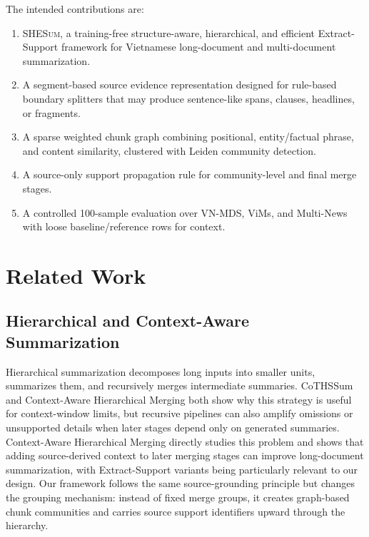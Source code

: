 \documentclass[11pt]{article}
\newcommand{\methodname}{\textsc{SHESum}}
\begin{document}
The intended contributions are:

\begin{enumerate}
    \item \methodname{}, a training-free structure-aware, hierarchical, and efficient Extract-Support framework for Vietnamese long-document and multi-document summarization.
    \item A segment-based source evidence representation designed for rule-based boundary splitters that may produce sentence-like spans, clauses, headlines, or fragments.
    \item A sparse weighted chunk graph combining positional, entity/factual phrase, and content similarity, clustered with Leiden community detection.
    \item A source-only support propagation rule for community-level and final merge stages.
    \item A controlled 100-sample evaluation over VN-MDS, ViMs, and Multi-News with loose baseline/reference rows for context.
\end{enumerate}

\section{Related Work}
\label{sec:related}

\subsection{Hierarchical and Context-Aware Summarization}

Hierarchical summarization decomposes long inputs into smaller units, summarizes them, and recursively merges intermediate summaries. CoTHSSum \citep{chen-2025-cothssum} and Context-Aware Hierarchical Merging \citep{ou-lapata-2025-hierarchical} both show why this strategy is useful for context-window limits, but recursive pipelines can also amplify omissions or unsupported details when later stages depend only on generated summaries. Context-Aware Hierarchical Merging directly studies this problem and shows that adding source-derived context to later merging stages can improve long-document summarization, with Extract-Support variants being particularly relevant to our design. Our framework follows the same source-grounding principle but changes the grouping mechanism: instead of fixed merge groups, it creates graph-based chunk communities and carries source support identifiers upward through the hierarchy.
\end{document}
